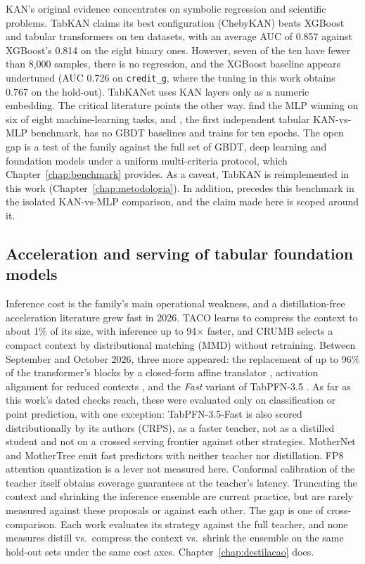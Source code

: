 KAN's original evidence \citep{kan2024} concentrates on symbolic
regression and scientific problems. TabKAN \citep{tabkan2025} claims its best configuration (ChebyKAN) beats XGBoost and tabular
transformers on ten datasets, with an average AUC of 0.857 against
XGBoost's 0.814 on the eight binary ones. However, seven of the ten have fewer than 8{,}000 samples, there is no regression, and
the XGBoost baseline appears undertuned (AUC 0.726 on \texttt{credit\_g}, where the tuning in this work obtains 0.767 on the hold-out).
TabKANet \citep{tabkanet2024} uses KAN layers only as a numeric
embedding. The critical literature points the other way.
\citet{kancritical2024} find the MLP winning on six of eight
machine-learning tasks, and \citet{poeta2024}, the first independent
tabular KAN-vs-MLP benchmark, has no GBDT baselines and trains for
ten epochs. The open gap is a test of the family against the full set
of GBDT, deep learning and foundation models under a uniform
multi-criteria protocol, which Chapter~\ref{chap:benchmark} provides.
As a caveat, TabKAN is reimplemented in this work
(Chapter~\ref{chap:metodologia}). In addition, \citet{poeta2024} precedes this benchmark in the isolated KAN-vs-MLP comparison, and the claim made here is scoped around it.

\subsection{Acceleration and serving of tabular foundation models}
\label{sec:rel-serving}

Inference cost is the family's main operational weakness, and a distillation-free acceleration literature grew fast in 2026.
TACO \citep{taco2026} learns to compress the context to about 1\% of
its size, with inference up to 94$\times$ faster, and CRUMB
\citep{crumb2026} selects a compact context by distributional
matching (MMD) without
retraining. Between September and October 2026, three more appeared: the replacement of up to 96\% of the transformer's blocks
by a closed-form affine translator \citep{shallow2026}, activation
alignment for reduced contexts \citep{actalign2026}, and the
\emph{Fast} variant of TabPFN-3.5 \citep{tabpfn35tr2026}. As far as this work's dated checks reach, these were evaluated only on classification or point
prediction, with one exception: TabPFN-3.5-Fast is also scored
distributionally by its authors (CRPS), as a faster teacher, not as a distilled student and not on a crossed serving
frontier against other strategies. MotherNet and MotherTree
\citep{mothernet2023,mothertree2026} emit fast predictors with
neither teacher nor distillation. FP8 attention quantization
\citep{kubler2026} is a lever not measured here. Conformal
calibration of the teacher itself \citep{park2026} obtains coverage
guarantees at the teacher's latency. Truncating the context and
shrinking the inference ensemble are current practice, but are rarely measured against these proposals or against each other. The
gap is one of cross-comparison. Each work evaluates its strategy
against the full teacher, and none measures distill vs.\ compress the
context vs.\ shrink the ensemble on the same hold-out sets under the
same cost axes. Chapter~\ref{chap:destilacao} does.

